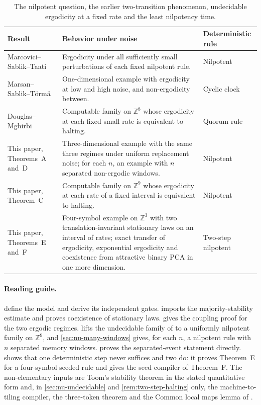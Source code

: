 \documentclass[11pt]{article}
\theoremstyle{plain}
\theoremstyle{definition}
\theoremstyle{remark}
\newcommand{\Z}{\mathbb Z}
\begin{document}
\begin{table}[t]
\centering\small
\begin{tabularx}{\textwidth}{@{}>{\raggedright\arraybackslash}p{} X >{\raggedright\arraybackslash}p{}@{}}
\toprule
Result & Behavior under noise & Deterministic rule\\
\midrule
Marcovici--Sablik--Taati \cite{MST19} & Ergodicity under all sufficiently small perturbations of each fixed nilpotent rule. & Nilpotent\\[4pt]
Marsan--Sablik--T\"orm\"a \cite{MST26} & One-dimensional example with ergodicity at low and high noise, and non-ergodicity between. & Cyclic clock\\[4pt]
Douglas--Mghirbi \cite{DM26A} & Computable family on $\Z^8$ whose ergodicity at each fixed small rate is equivalent to halting. & Quorum rule\\[4pt]
This paper, Theorems~A and~D & Three-dimensional example with the same three regimes under uniform replacement noise; for each $n$, an example with $n$ separated non-ergodic windows. & Nilpotent\\[4pt]
This paper, Theorem~C & Computable family on $\Z^9$ whose ergodicity at each rate of a fixed interval is equivalent to halting. & Nilpotent\\[4pt]
This paper, Theorems~E and~F & Four-symbol example on $\Z^3$ with two translation-invariant stationary laws on an interval of rates; exact transfer of ergodicity, exponential ergodicity and coexistence from attractive binary PCA in one more dimension. & Two-step nilpotent\\
\bottomrule
\end{tabularx}
\caption{The nilpotent question, the earlier two-transition phenomenon, undecidable ergodicity at a fixed rate and the least nilpotency time.}
\label{tab:landscape}
\end{table}

\paragraph{Reading guide.}
 define the model and derive its independent gates.  imports the majority-stability estimate and proves coexistence of stationary laws.  gives the coupling proof for the two ergodic regimes.  lifts the undecidable family of \cite{DM26A} to a uniformly nilpotent family on $\Z^9$, and \cref{sec:nu-many-windows} gives, for each $n$, a nilpotent rule with $n$ separated memory windows.  proves the separated-event statement directly.  shows that one deterministic step never suffices and two do: it proves Theorem~E for a four-symbol seeded rule and gives the seed compiler of Theorem~F. The non-elementary inputs are Toom's stability theorem in the stated quantitative form and, in \cref{sec:nu-undecidable} and \cref{rem:two-step-halting} only, the machine-to-tiling compiler, the three-token theorem and the Common local maps lemma of \cite{DM26A}.
\end{document}

